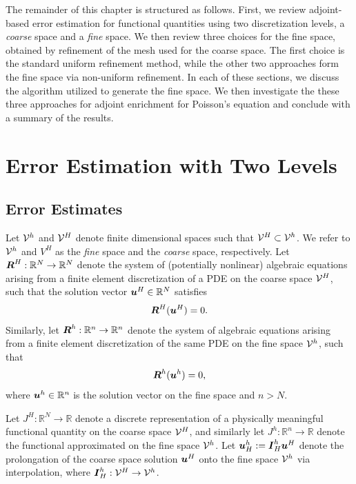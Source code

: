 The remainder of this chapter is structured as follows.
First, we review adjoint-based error estimation for
functional quantities using two discretization levels,
a \emph{coarse} space and a \emph{fine} space. We then
review three choices for the fine space, obtained
by refinement of the mesh used for the coarse space.
The first choice is the standard uniform refinement
method, while the other two approaches form the fine
space via non-uniform refinement. In each of these
sections, we discuss the algorithm utilized to generate
the fine space. We then investigate the these three
approaches for adjoint enrichment for Poisson's equation
and conclude with a summary of the results.

\section{Error Estimation with Two Levels}

\subsection{Error Estimates}

Let $\mathcal{V}^h$ and $\mathcal{V}^H$ denote finite dimensional spaces
such that $\mathcal{V}^H \subset \mathcal{V}^h$. We refer to $\mathcal{V}^h$
and $V^H$ as the \emph{fine} space and the \emph{coarse}
space, respectively. Let $\boldsymbol{R}^H : \mathbb{R}^N \to \mathbb{R}^N$
denote the system of (potentially nonlinear) algebraic equations
arising from a finite element discretization of a PDE on the
coarse space $\mathcal{V}^H$, such that the solution vector
$\boldsymbol{u}^H \in \mathbb{R}^N$ satisfies
%
\begin{gather}
\boldsymbol{R}^H(\boldsymbol{u}^H) = 0.
\label{eq:refine_residual_coarse}
\end{gather}
%
Similarly, let $\boldsymbol{R}^h : \mathbb{R}^n \to \mathbb{R}^n$
denote the system of algebraic equations arising from a finite
element discretization of the same PDE on the fine space
$\mathcal{V}^h$, such that
%
\begin{gather}
\boldsymbol{R}^h(\boldsymbol{u}^h) = 0,
\label{eq:refine_residual_fine}
\end{gather}
%
where $\boldsymbol{u}^h \in \mathbb{R}^n$ is the solution vector on
the fine space and $n > N$.

Let $J^H : \mathbb{R}^N \to \mathbb{R}$ denote a discrete
representation of a physically meaningful functional quantity
on the coarse space $\mathcal{V}^H$, and similarly let
$J^h : \mathbb{R}^n \to \mathbb{R}$ denote the functional
approximated on the fine space $\mathcal{V}^h$. Let
$\boldsymbol{u}^h_H := \boldsymbol{I}^h_H \boldsymbol{u}^H$ denote the prolongation of
the coarse space solution $\boldsymbol{u}^H$ onto the fine space
$\mathcal{V}^h$ via interpolation, where
$\boldsymbol{I}^h_H : \mathcal{V}^H \to \mathcal{V}^h$.

